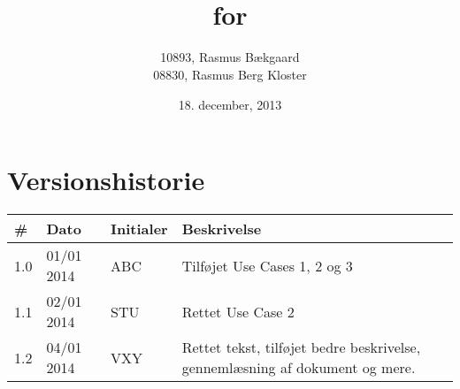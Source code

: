 \documentclass[oneside, 12pt]{memoir}
\title{\DocumentType \\ for \\ \ProjectName}
\date{18. december, 2013}
\author{10893, Rasmus Bækgaard\\08830, Rasmus Berg Kloster}
\begin{document}
\begin{titlingpage}
	
\end{titlingpage}


\section*{Versionshistorie}
\begin{tabular}{p{} p{} p{} p{}}
\hline
\textbf{\#} & \textbf{Dato} & \textbf{Initialer} & \textbf{Beskrivelse }\\
\hline
1.0 & 01/01 2014 & ABC & Tilføjet Use Cases 1, 2 og 3 \\ 
1.1 & 02/01 2014 & STU & Rettet Use Case 2 \\
1.2 & 04/01 2014 & VXY & Rettet tekst, tilføjet bedre beskrivelse, gennemlæsning af dokument og mere.\\ \hline
\end{tabular} 
 


\newpage
\tableofcontents* %

\listoffixmes









%
%
%
%
\end{document}
